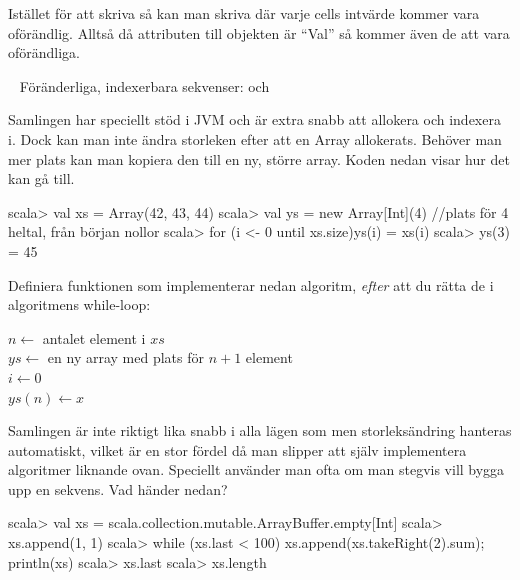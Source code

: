 \SubtaskSolved  Istället för att skriva  så kan man skriva  där varje cells intvärde kommer vara oförändlig.
Alltså då attributen till objekten är “Val” så kommer även de att vara oförändliga.



\QUESTEND









\QUESTBEGIN

\Task  \what~ Föränderliga, indexerbara sekvenser:  och 

\Subtask Samlingen  har speciellt stöd i JVM och är extra snabb att allokera och indexera i. Dock kan man inte ändra storleken efter att en Array allokerats. Behöver man mer plats kan man kopiera den till en ny, större array. Koden nedan visar hur det kan gå till.
\begin{REPL}
scala> val xs = Array(42, 43, 44)
scala> val ys = new Array[Int](4)  //plats för 4 heltal, från början nollor
scala> for (i <- 0 until xs.size){ys(i) = xs(i)}
scala> ys(3) = 45
\end{REPL}
Definiera funktionen  som implementerar nedan algoritm, \emph{efter} att du rätta de \textbf{\color{red}{två buggarna}} i algoritmens while-loop:

\begin{algorithm}[H]

 $n \leftarrow$ antalet element i $xs$ \\
 $ys \leftarrow$ en ny array med plats för $n + 1$ element\\
 $i \leftarrow 0$  \\
 $ys(n) \leftarrow x$
\end{algorithm}



\Subtask Samlingen  är inte riktigt lika snabb i alla lägen som  men storleksändring hanteras automatiskt, vilket är en stor fördel då man slipper att själv implementera algoritmer liknande  ovan. Speciellt använder man ofta  om man stegvis vill bygga upp en sekvens. Vad händer nedan?
\begin{REPL}
scala> val xs = scala.collection.mutable.ArrayBuffer.empty[Int]
scala> xs.append(1, 1)
scala> while (xs.last < 100) {xs.append(xs.takeRight(2).sum); println(xs)}
scala> xs.last
scala> xs.length
\end{REPL}


